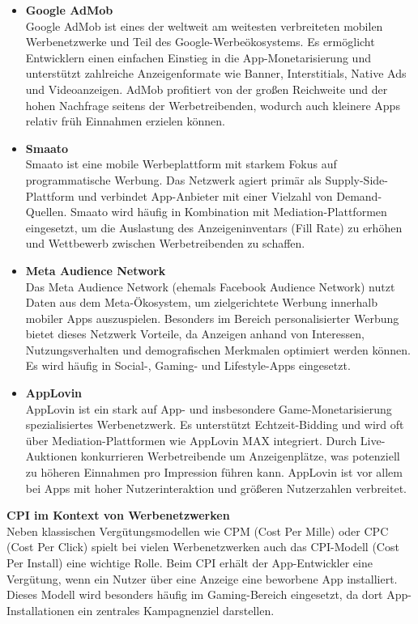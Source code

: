 \begin{itemize}
\item \textbf{Google AdMob}\\
Google AdMob ist eines der weltweit am weitesten verbreiteten mobilen Werbenetzwerke und Teil des Google-Werbeökosystems. Es ermöglicht Entwicklern einen einfachen Einstieg in die App-Monetarisierung und unterstützt zahlreiche Anzeigenformate wie Banner, Interstitials, Native Ads und Videoanzeigen. AdMob profitiert von der großen Reichweite und der hohen Nachfrage seitens der Werbetreibenden, wodurch auch kleinere Apps relativ früh Einnahmen erzielen können.\cite{Mobile_add_networks}

\item \textbf{Smaato}\\
Smaato ist eine mobile Werbeplattform mit starkem Fokus auf programmatische Werbung. Das Netzwerk agiert primär als Supply-Side-Plattform und verbindet App-Anbieter mit einer Vielzahl von Demand-Quellen. Smaato wird häufig in Kombination mit Mediation-Plattformen eingesetzt, um die Auslastung des Anzeigeninventars (Fill Rate) zu erhöhen und Wettbewerb zwischen Werbetreibenden zu schaffen.\cite{Mobile_add_networks}

\item \textbf{Meta Audience Network}\\
Das Meta Audience Network (ehemals Facebook Audience Network) nutzt Daten aus dem Meta-Ökosystem, um zielgerichtete Werbung innerhalb mobiler Apps auszuspielen. Besonders im Bereich personalisierter Werbung bietet dieses Netzwerk Vorteile, da Anzeigen anhand von Interessen, Nutzungsverhalten und demografischen Merkmalen optimiert werden können. Es wird häufig in Social-, Gaming- und Lifestyle-Apps eingesetzt.\cite{Mobile_add_networks}

\item \textbf{AppLovin}\\
AppLovin ist ein stark auf App- und insbesondere Game-Monetarisierung spezialisiertes Werbenetzwerk. Es unterstützt Echtzeit-Bidding und wird oft über Mediation-Plattformen wie AppLovin MAX integriert. Durch Live-Auktionen konkurrieren Werbetreibende um Anzeigenplätze, was potenziell zu höheren Einnahmen pro Impression führen kann. AppLovin ist vor allem bei Apps mit hoher Nutzerinteraktion und größeren Nutzerzahlen verbreitet.\cite{Mobile_add_networks}
\end{itemize}
\medskip
\textbf{CPI im Kontext von Werbenetzwerken}\\
Neben klassischen Vergütungsmodellen wie CPM (Cost Per Mille) oder CPC (Cost Per Click) spielt bei vielen Werbenetzwerken auch das CPI-Modell (Cost Per Install) eine wichtige Rolle. Beim CPI erhält der App-Entwickler eine Vergütung, wenn ein Nutzer über eine Anzeige eine beworbene App installiert. Dieses Modell wird besonders häufig im Gaming-Bereich eingesetzt, da dort App-Installationen ein zentrales Kampagnenziel darstellen.
